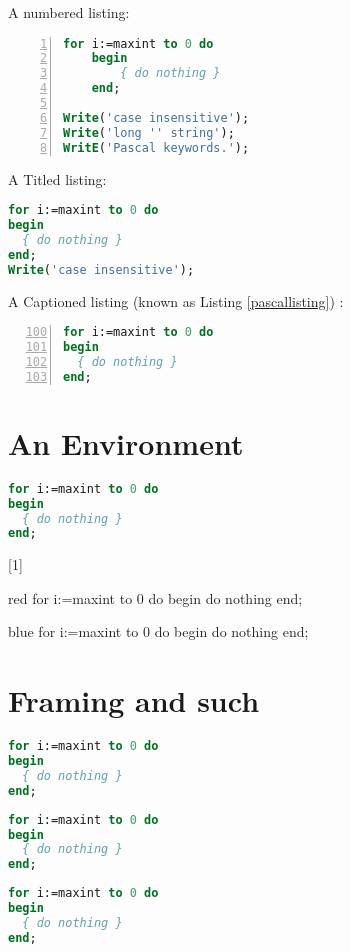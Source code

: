 \documentclass{article}
\begin{document}
A numbered listing:
\begin{lstlisting}[language=Pascal,numbers=left, numberstyle=\tiny, stepnumber=2,stringstyle=\color{red}\ttfamily,showspaces,tabsize=4]
for i:=maxint to 0 do
	begin
		{ do nothing }
	end;

Write('case insensitive');
Write('long '' string');
WritE('Pascal keywords.');
\end{lstlisting}

A Titled listing:
\begin{lstlisting}[language=Pascal,title={A bit of Pascal}]
for i:=maxint to 0 do
begin
  { do nothing }
end;
Write('case insensitive');
\end{lstlisting}


A Captioned listing (known as Listing \ref{pascallisting}) :
\begin{lstlisting}[language=Pascal,caption=Another bit of Pascal, label=pascallisting,firstnumber=100,numbers=left]
for i:=maxint to 0 do
begin
  { do nothing }
end;
\end{lstlisting}

\section{An Environment}
\begin{lstlisting}[language=Pascal]
for i:=maxint to 0 do
begin
  { do nothing }
end;
\end{lstlisting}

[1]{}{}
\begin{colored}{red}
for i:=maxint to 0 do
begin
  { do nothing }
end;
\end{colored}

\begin{colored}{blue}
for i:=maxint to 0 do
begin
  { do nothing }
end;
\end{colored}

\section{Framing and such}
\begin{lstlisting}[language=Pascal,frame=single,rulecolor=\color{red}]
for i:=maxint to 0 do
begin
  { do nothing }
end;
\end{lstlisting}

\begin{lstlisting}[language=Pascal,frameround=tttt,backgroundcolor=\color{yellow}]
for i:=maxint to 0 do
begin
  { do nothing }
end;
\end{lstlisting}
\lstset{backgroundcolor=}
\begin{lstlisting}[language=Pascal,frame=single]
for i:=maxint to 0 do
begin
  { do nothing }
end;
\end{lstlisting}
\end{document}
